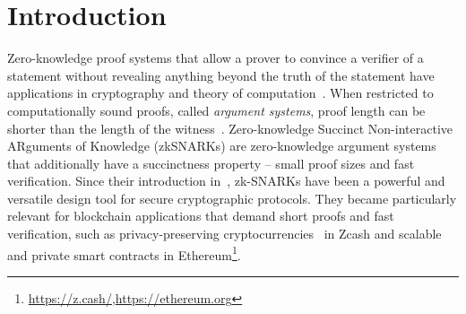 \section{Introduction}
Zero-knowledge proof systems that allow a prover to convince a verifier of a statement without revealing anything beyond the truth of the statement have applications in cryptography and theory of computation~\cite{FOCS:GolMicWig86,STOC:Fortnow87,C:BGGHKMR88}. 
When restricted to computationally sound proofs, called \emph{argument systems}, proof length can be shorter than the length of the witness~\cite{brassard1988minimum}. 
Zero-knowledge Succinct Non-interactive ARguments of Knowledge (zkSNARKs) are zero-knowledge argument systems that additionally have a succinctness property -- small proof sizes and fast verification. 
Since their introduction in~\cite{FOCS:Micali94}, zk-SNARKs have been a powerful and versatile design tool for secure cryptographic protocols. They became particularly relevant for blockchain applications that demand short proofs and fast verification, such as privacy-preserving cryptocurrencies~\cite{SP:BCGGMT14} in Zcash and scalable and private smart contracts in Ethereum\footnote{\url{https://z.cash/},\url{https://ethereum.org}}.


